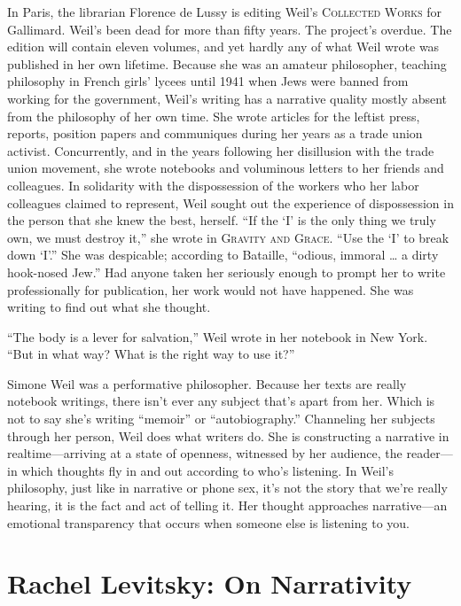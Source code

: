 \documentclass[
]{memoir}
\begin{document}
In Paris, the librarian Florence de Lussy is editing Weil's
\textsc{Collected Works} for Gallimard. Weil's been dead for more than
fifty years. The project's overdue. The edition will contain eleven
volumes, and yet hardly any of what Weil wrote was published in her own
lifetime. Because she was an amateur philosopher, teaching philosophy in
French girls' lycees until 1941 when Jews were banned from working for
the government, Weil's writing has a narrative quality mostly absent
from the philosophy of her own time. She wrote articles for the leftist
press, reports, position papers and communiques during her years as a
trade union activist. Concurrently, and in the years following her
disillusion with the trade union movement, she wrote notebooks and
voluminous letters to her friends and colleagues. In solidarity with the
dispossession of the workers who her labor colleagues claimed to
represent, Weil sought out the experience of dispossession in the person
that she knew the best, herself. ``If the `I' is the only thing we truly
own, we must destroy it,'' she wrote in \textsc{Gravity and Grace}.
``Use the `I' to break down `I'.'' She was despicable; according to
Bataille, ``odious, immoral \ldots{} a dirty hook-nosed Jew.'' Had
anyone taken her seriously enough to prompt her to write professionally
for publication, her work would not have happened. She was writing to
find out what she thought.

``The body is a lever for salvation,'' Weil wrote in her notebook in New
York. ``But in what way? What is the right way to use it?''

Simone Weil was a performative philosopher. Because her texts are really
notebook writings, there isn't ever any subject that's apart from her.
Which is not to say she's writing ``memoir'' or ``autobiography.''
Channeling her subjects through her person, Weil does what writers do.
She is constructing a narrative in realtime---arriving at a state of
openness, witnessed by her audience, the reader---in which thoughts fly
in and out according to who's listening. In Weil's philosophy, just like
in narrative or phone sex, it's not the story that we're really hearing,
it is the fact and act of telling it. Her thought approaches
narrative---an emotional transparency that occurs when someone else is
listening to you.

\hypertarget{rachel-levitsky-on-narrativity}{%
\chapter{Rachel Levitsky: On
Narrativity}\label{rachel-levitsky-on-narrativity}}
\end{document}
